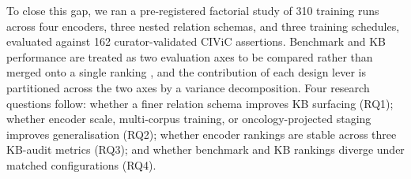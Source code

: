 To close this gap, we ran a pre-registered factorial study of 310
training runs across four encoders, three nested relation schemas,
and three training schedules, evaluated against 162
curator-validated CIViC assertions. Benchmark and KB performance
are treated as two evaluation axes to be compared rather than
merged onto a single ranking
\citep{lawlor2017triangulation,liugaunt2024asq}, and the
contribution of each design lever is partitioned across the two
axes by a variance decomposition. Four research questions follow:
whether a finer relation schema improves KB surfacing (RQ1);
whether encoder scale, multi-corpus training, or
oncology-projected staging improves generalisation (RQ2); whether
encoder rankings are stable across three KB-audit metrics (RQ3);
and whether benchmark and KB rankings diverge under matched
configurations (RQ4).
